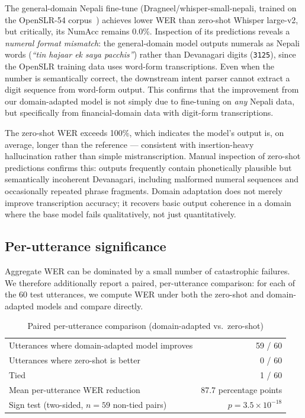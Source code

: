 \documentclass[11pt,a4paper]{article}
\begin{document}
The general-domain Nepali fine-tune (Dragneel/whisper-small-nepali,
trained on the OpenSLR-54 corpus~\cite{openslr54}) achieves lower WER
than zero-shot Whisper large-v2, but critically, its NumAcc remains
0.0\%. Inspection of its predictions reveals a \textit{numeral format
mismatch}: the general-domain model outputs numerals as Nepali words
(\textit{``tin hajaar ek saya pacchis''}) rather than Devanagari digits
(\texttt{3125}), since the OpenSLR training data uses word-form
transcriptions. Even when the number is semantically correct, the
downstream intent parser cannot extract a digit sequence from word-form
output. This confirms that the improvement from our domain-adapted model
is not simply due to fine-tuning on \textit{any} Nepali data, but
specifically from financial-domain data with digit-form transcriptions.

The zero-shot WER exceeds 100\%, which indicates the model's output is, on
average, longer than the reference --- consistent with insertion-heavy
hallucination rather than simple mistranscription. Manual inspection of
zero-shot predictions confirms this: outputs frequently contain
phonetically plausible but semantically incoherent Devanagari, including
malformed numeral sequences and occasionally repeated phrase fragments.
Domain adaptation does not merely improve transcription accuracy; it
recovers basic output coherence in a domain where the base model fails
qualitatively, not just quantitatively.

\subsection{Per-utterance significance}

Aggregate WER can be dominated by a small number of catastrophic failures.
We therefore additionally report a paired, per-utterance comparison: for
each of the 60 test utterances, we compute WER under both the zero-shot
and domain-adapted models and compare directly.

\begin{table}[H]
\centering
\caption{Paired per-utterance comparison (domain-adapted vs.\ zero-shot)}
\label{tab:paired}
\begin{tabular}{lr}
\toprule
Utterances where domain-adapted model improves & 59 / 60 \\
Utterances where zero-shot is better & 0 / 60 \\
Tied & 1 / 60 \\
Mean per-utterance WER reduction & 87.7 percentage points \\
Sign test (two-sided, $n=59$ non-tied pairs) & $p = 3.5\times10^{-18}$ \\
\bottomrule
\end{tabular}
\end{table}
\end{document}
